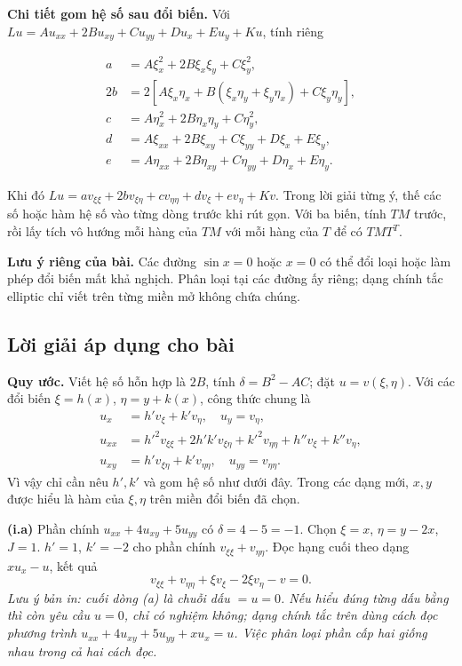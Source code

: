 \documentclass[10pt,a4paper]{article}
\begin{document}
\textbf{Chi tiết gom hệ số sau đổi biến.} Với $Lu=Au_{xx}+2Bu_{xy}+Cu_{yy}+Du_x+Eu_y+Ku$, tính riêng


\[
\begin{aligned}
a&=A\xi_x^2+2B\xi_x\xi_y+C\xi_y^2,\\
2b&=2[A\xi_x\eta_x+B(\xi_x\eta_y+\xi_y\eta_x)+C\xi_y\eta_y],\\
c&=A\eta_x^2+2B\eta_x\eta_y+C\eta_y^2,\\
d&=A\xi_{xx}+2B\xi_{xy}+C\xi_{yy}+D\xi_x+E\xi_y,\\
e&=A\eta_{xx}+2B\eta_{xy}+C\eta_{yy}+D\eta_x+E\eta_y.
\end{aligned}
\]


Khi đó $Lu=av_{\xi\xi}+2bv_{\xi\eta}+cv_{\eta\eta}+dv_\xi+ev_\eta+Kv$. Trong lời giải từng ý, thế các số hoặc hàm hệ số vào từng dòng trước khi rút gọn. Với ba biến, tính $TM$ trước, rồi lấy tích vô hướng mỗi hàng của $TM$ với mỗi hàng của $T$ để có $TMT^T$.

\textbf{Lưu ý riêng của bài.} Các đường $\sin x=0$ hoặc $x=0$ có thể đổi loại hoặc làm phép đổi biến mất khả nghịch. Phân loại tại các đường ấy riêng; dạng chính tắc elliptic chỉ viết trên từng miền mở không chứa chúng.
\subsection*{Lời giải áp dụng cho bài}
\textbf{Quy ước.} Viết hệ số hỗn hợp là $2B$, tính $\delta=B^2-AC$; đặt $u=v(\xi,\eta)$. Với các đổi biến $\xi=h(x)$, $\eta=y+k(x)$, công thức chung là
\begin{align*}
u_x&=h'v_\xi+k'v_\eta,\quad u_y=v_\eta,\\
u_{xx}&=h'^2v_{\xi\xi}+2h'k'v_{\xi\eta}+k'^2v_{\eta\eta}+h''v_\xi+k''v_\eta,\\
u_{xy}&=h'v_{\xi\eta}+k'v_{\eta\eta},\quad u_{yy}=v_{\eta\eta}.
\end{align*}
Vì vậy chỉ cần nêu $h',k'$ và gom hệ số như dưới đây. Trong các dạng mới, $x,y$ được hiểu là hàm của $\xi,\eta$ trên miền đổi biến đã chọn.

\textbf{(i.a)} Phần chính $u_{xx}+4u_{xy}+5u_{yy}$ có $\delta=4-5=-1$. Chọn $\xi=x$, $\eta=y-2x$, $J=1$. $h'=1$, $k'=-2$ cho phần chính $v_{\xi\xi}+v_{\eta\eta}$. Đọc hạng cuối theo dạng $xu_x-u$, kết quả
\[v_{\xi\xi}+v_{\eta\eta}+\xi v_\xi-2\xi v_\eta-v=0.\]
\textit{Lưu ý bản in: cuối dòng (a) là chuỗi dấu $=u=0$. Nếu hiểu đúng từng dấu bằng thì còn yêu cầu $u=0$, chỉ có nghiệm không; dạng chính tắc trên dùng cách đọc phương trình $u_{xx}+4u_{xy}+5u_{yy}+xu_x=u$. Việc phân loại phần cấp hai giống nhau trong cả hai cách đọc.}
\end{document}
